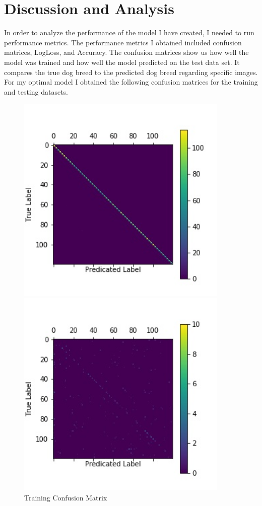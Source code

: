 \documentclass[12pt]{article}
\begin{document}
\section{Discussion and Analysis}
\quad In order to analyze the performance of the model I have created, I needed to run performance metrics.  The performance metrics I obtained included confusion matrices, LogLoss, and Accuracy.  The confusion matrices show us how well the model was trained and how well the model predicted on the test data set.  It compares the true dog breed to the predicted dog breed regarding specific images.  For my optimal model I obtained the following confusion matrices for the training and testing datasets.
\begin{figure}[H]
    \begin{minipage}{0.45\textwidth}
        \includegraphics[width=0.9\textwidth]{confusion_matrix_train.jpg}
        \caption{Training Confusion Matrix}
    \end{minipage}\hfill
    \begin{minipage}{0.45\textwidth}
        \includegraphics[width=0.9\textwidth]{confusion_matrix_test.jpg}

\end{minipage}
\end{figure}
\end{document}
